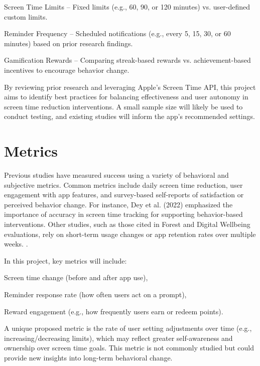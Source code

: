 \documentclass[10pt,twocolumn]{article}
\begin{document}
    Screen Time Limits – Fixed limits (e.g., 60, 90, or 120 minutes) vs. user-defined custom limits.

    Reminder Frequency – Scheduled notifications (e.g., every 5, 15, 30, or 60 minutes) based on prior research findings.

    Gamification Rewards – Comparing streak-based rewards vs. achievement-based incentives to encourage behavior change.

By reviewing prior research and leveraging Apple’s Screen Time API, this project aims to identify best practices for balancing effectiveness and user autonomy in screen time reduction interventions. A small sample size will likely be used to conduct testing, and existing studies will inform the app's recommended settings.


\section{Metrics}

Previous studies have measured success using a variety of behavioral and subjective metrics. Common metrics include daily screen time reduction, user engagement with app features, and survey-based self-reports of satisfaction or perceived behavior change. For instance, Dey et al. (2022) emphasized the importance of accuracy in screen time tracking for supporting behavior-based interventions. Other studies, such as those cited in Forest and Digital Wellbeing evaluations, rely on short-term usage changes or app retention rates over multiple weeks. \cite{ScreentimeMentalHealth}. 

In this project, key metrics will include:

Screen time change (before and after app use),

Reminder response rate (how often users act on a prompt),

Reward engagement (e.g., how frequently users earn or redeem points).

A unique proposed metric is the rate of user setting adjustments over time (e.g., increasing/decreasing limits), which may reflect greater self-awareness and ownership over screen time goals. This metric is not commonly studied but could provide new insights into long-term behavioral change.

\printbibliography
\end{document}
